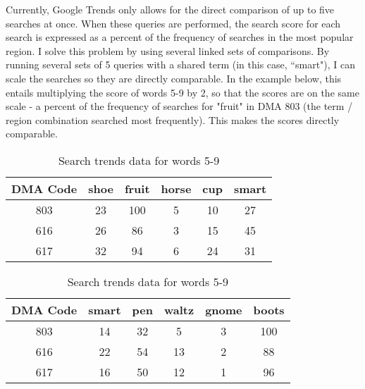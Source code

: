 \documentclass{article}
\begin{document}
Currently, Google Trends only allows for the direct comparison of up to five searches at once.
When these queries are performed, the search score for each search is expressed as a percent of the frequency of searches in the most popular region.
I solve this problem by using several linked sets of comparisons.
By running several sets of 5 queries with a shared term (in this case, ``smart"), I can scale the searches so they are directly comparable.
In the example below, this entails multiplying the score of words 5-9 by 2, so that the scores are on the same scale - a percent of the frequency of searches for "fruit" in DMA 803 (the term / region combination searched most frequently).
This makes the scores directly comparable.

\begin{table}[H]
    \caption{Example Raw Data From Google Trends}
    \begin{minipage}{.6\linewidth}
        \centering
        \begin{tabular}{|c|c|c|c|c|c|}
            \hline
            DMA Code           & shoe & fruit & horse & cup & smart \\ \hline
            803   & 23          & 100     & 5           & 10            & 27         \\ \hline
            616   & 26          & 86      & 3           & 15            & 45         \\ \hline
            617    & 32          & 94      & 6           & 24            & 31 \\ \hline
        \end{tabular}
        \caption*{Search trends data for words 1-5}
    \end{minipage}%
    \begin{minipage}{.6\linewidth}
        \centering
        \begin{tabular}{|c|c|c|c|c|c|}
            \hline
            DMA Code           & smart & pen & waltz & gnome & boots \\ \hline
            803   & 14         & 32    & 5       & 3       & 100     \\ \hline
            616   & 22         & 54    & 13      & 2       & 88      \\ \hline
            617         & 16         & 50    & 12      & 1       & 96      \\ \hline
        \end{tabular}
        \caption*{Search trends data for words 5-9}
    \end{minipage}
\end{table}
\end{document}
